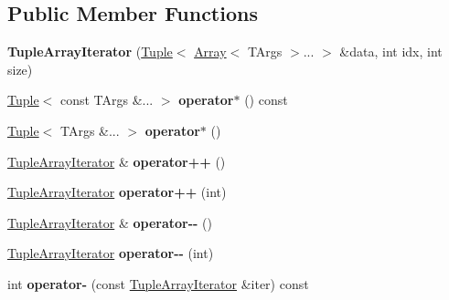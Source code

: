 \subsection*{Public Member Functions}
\begin{DoxyCompactItemize}
\item 
\hypertarget{classTupleArrayIterator_a7c084ea3b987b6ff7720d4a46176553e}{}\label{classTupleArrayIterator_a7c084ea3b987b6ff7720d4a46176553e} 
{\bfseries Tuple\+Array\+Iterator} (\hyperlink{classTuple}{Tuple}$<$ \hyperlink{classArray}{Array}$<$ T\+Args $>$... $>$ \&data, int idx, int size)
\item 
\hypertarget{classTupleArrayIterator_a8e721d8cfedbd047655be588016ef810}{}\label{classTupleArrayIterator_a8e721d8cfedbd047655be588016ef810} 
\hyperlink{classTuple}{Tuple}$<$ const T\+Args \&... $>$ {\bfseries operator$\ast$} () const
\item 
\hypertarget{classTupleArrayIterator_a967730b9d8bcfecb55b1a35d64e7bcf0}{}\label{classTupleArrayIterator_a967730b9d8bcfecb55b1a35d64e7bcf0} 
\hyperlink{classTuple}{Tuple}$<$ T\+Args \&... $>$ {\bfseries operator$\ast$} ()
\item 
\hypertarget{classTupleArrayIterator_a81296c13dc152b98e734ec7404187891}{}\label{classTupleArrayIterator_a81296c13dc152b98e734ec7404187891} 
\hyperlink{classTupleArrayIterator}{Tuple\+Array\+Iterator} \& {\bfseries operator++} ()
\item 
\hypertarget{classTupleArrayIterator_a5e61927b1f3503479756aed6eba0f4af}{}\label{classTupleArrayIterator_a5e61927b1f3503479756aed6eba0f4af} 
\hyperlink{classTupleArrayIterator}{Tuple\+Array\+Iterator} {\bfseries operator++} (int)
\item 
\hypertarget{classTupleArrayIterator_a254f16eb84c5d9b57c34a8def2d7a725}{}\label{classTupleArrayIterator_a254f16eb84c5d9b57c34a8def2d7a725} 
\hyperlink{classTupleArrayIterator}{Tuple\+Array\+Iterator} \& {\bfseries operator-\/-\/} ()
\item 
\hypertarget{classTupleArrayIterator_a8bd22e11313e6b21944eca96b37b381d}{}\label{classTupleArrayIterator_a8bd22e11313e6b21944eca96b37b381d} 
\hyperlink{classTupleArrayIterator}{Tuple\+Array\+Iterator} {\bfseries operator-\/-\/} (int)
\item 
\hypertarget{classTupleArrayIterator_aab16c3f84d0e9e1eead8854bea01604a}{}\label{classTupleArrayIterator_aab16c3f84d0e9e1eead8854bea01604a} 
int {\bfseries operator-\/} (const \hyperlink{classTupleArrayIterator}{Tuple\+Array\+Iterator} \&iter) const
\item 

\end{DoxyCompactItemize}
